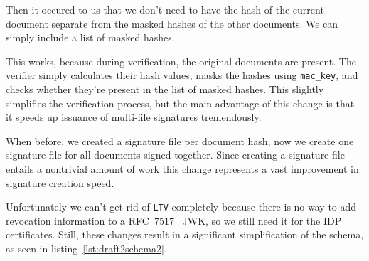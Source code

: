 Then it occured to us that we don't need to have the hash of the current document separate from the masked hashes of the other documents.
We can simply include a list of masked hashes.

This works, because during verification, the original documents are present.
The verifier simply calculates their hash values, masks the hashes using \texttt{mac\_key},
and checks whether they're present in the list of masked hashes.
This slightly simplifies the verification process,
but the main advantage of this change is that it speeds up issuance of multi-file signatures tremendously.

When before, we created a signature file per document hash, now we create one signature file for all documents signed together.
Since creating a signature file entails a nontrivial amount of work this change represents a vast improvement in signature creation speed.




Unfortunately we can't get rid of \texttt{LTV} completely because there is no way to add revocation information
to a RFC~7517~\cite{rfc7517} JWK, so we still need it for the \gls{IDP} certificates.
Still, these changes result in a significant simplification of the schema, as seen in listing~\ref{lst:draft2schema2}.

